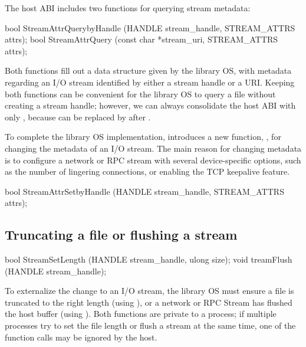 The host ABI includes two functions for querying stream metadata:

\begin{paldef}
bool StreamAttrQuerybyHandle (HANDLE stream_handle,
                              STREAM_ATTRS attrs);
bool StreamAttrQuery (const char *stream_uri,
                      STREAM_ATTRS attrs);

\end{paldef}

Both functions fill out a data structure given by the library OS,
with metadata regarding an I/O stream
identified by either a stream handle or a URI.
Keeping both functions can be convenient for the library OS to query a file without creating a stream handle;
however, we can always consolidate the host ABI
with only ,
because  can be replaced by 
after .


To complete the library OS implementation, \graphene{} introduces a new function,
,
for changing the metadata of an I/O stream.
The main reason for changing metadata
is to configure a network or RPC stream with several device-specific options,
such as the number of lingering connections,
or enabling the TCP keepalive feature.









\begin{paldef}
bool StreamAttrSetbyHandle (HANDLE stream_handle,
                            STREAM_ATTRS attrs);
\end{paldef}


\subsection*{Truncating a file or flushing a stream}


\begin{paldef}
bool StreamSetLength (HANDLE stream_handle, ulong size);
void treamFlush (HANDLE stream_handle);
\end{paldef}


To externalize the change to an I/O stream, the library OS must ensure a file is truncated to the right length (using ), or a network or RPC Stream has flushed the host buffer (using ).
Both functions are private to a process; if multiple processes try
to set the file length or flush a stream at the same time, one of the function calls may be ignored by the host.






